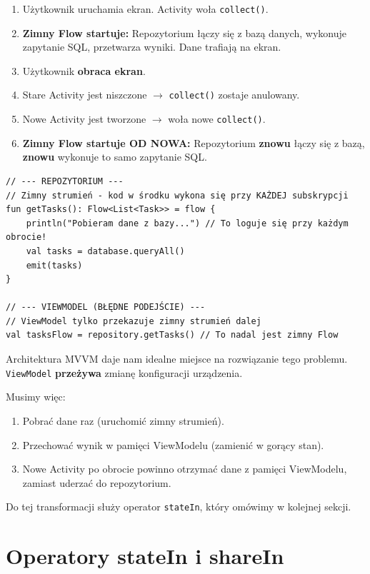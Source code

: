 \begin{enumerate}
    \item Użytkownik uruchamia ekran. Activity woła \texttt{collect()}.
    \item \textbf{Zimny Flow startuje:} Repozytorium łączy się z bazą danych, wykonuje zapytanie SQL, przetwarza wyniki. Dane trafiają na ekran.
    \item Użytkownik \textbf{obraca ekran}.
    \item Stare Activity jest niszczone $\rightarrow$ \texttt{collect()} zostaje anulowany.
    \item Nowe Activity jest tworzone $\rightarrow$ woła nowe \texttt{collect()}.
    \item \textbf{Zimny Flow startuje OD NOWA:} Repozytorium \textbf{znowu} łączy się z bazą, \textbf{znowu} wykonuje to samo zapytanie SQL.
\end{enumerate}

\begin{verbatim}
// --- REPOZYTORIUM ---
// Zimny strumień - kod w środku wykona się przy KAŻDEJ subskrypcji
fun getTasks(): Flow<List<Task>> = flow {
    println("Pobieram dane z bazy...") // To loguje się przy każdym obrocie!
    val tasks = database.queryAll()
    emit(tasks)
}

// --- VIEWMODEL (BŁĘDNE PODEJŚCIE) ---
// ViewModel tylko przekazuje zimny strumień dalej
val tasksFlow = repository.getTasks() // To nadal jest zimny Flow
\end{verbatim}

Architektura MVVM daje nam idealne miejsce na rozwiązanie tego problemu. \texttt{ViewModel} \textbf{przeżywa} zmianę konfiguracji urządzenia.

Musimy więc:
\begin{enumerate}
    \item Pobrać dane raz (uruchomić zimny strumień).
    \item Przechować wynik w pamięci ViewModelu (zamienić w gorący stan).
    \item Nowe Activity po obrocie powinno otrzymać dane z pamięci ViewModelu, zamiast uderzać do repozytorium.
\end{enumerate}

Do tej transformacji służy operator \texttt{stateIn}, który omówimy w kolejnej sekcji.

\section{Operatory stateIn i shareIn}

